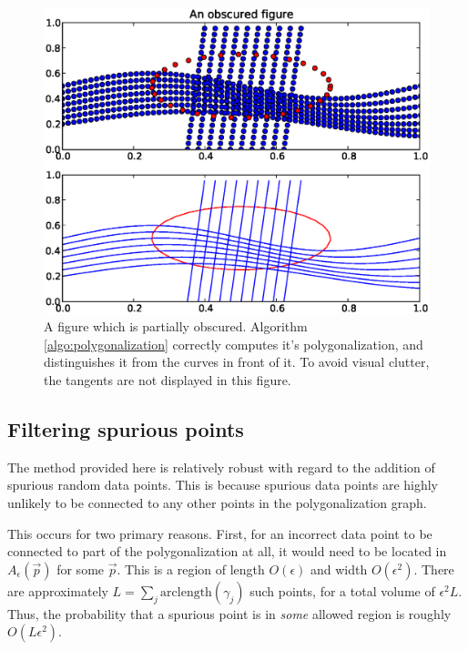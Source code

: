 \documentclass{article}
\numberwithin{cntr}{section}
\numberwithin{equation}{section}
\newcommand{\vp}[0]{{\vec{p}}}
\newcommand{\allowed}[2]{ { A_{#1}(#2) } }
\begin{document}
\begin{figure}
\setlength{\unitlength}{0.240900pt}
\ifx\plotpoint\undefined\newsavebox{\plotpoint}\fi
\sbox{\plotpoint}{\rule[-0.200pt]{0.400pt}{0.400pt}}%
\includegraphics[scale=0.5]{obscured_figure.eps}

\caption{A figure which is partially obscured. Algorithm \ref{algo:polygonalization} correctly computes it's polygonalization, and distinguishes it from the curves in front of it. To avoid visual clutter, the tangents are not displayed in this figure.}
\label{fig:obscuredExample}
\end{figure}

\subsection{Filtering spurious points}

The method provided here is relatively robust with regard to the addition of spurious random data points. This is because spurious data points are highly unlikely to be connected to any other points in the polygonalization graph.

This occurs for two primary reasons. First, for an incorrect data point to be connected to part of the polygonalization at all, it would need to be located in $\allowed{\epsilon}{\vp}$ for some $\vp$. This is a region of length $O(\epsilon)$ and width $O(\epsilon^{2})$. There are approximately $L = \sum_{j} \textrm{arclength}(\gamma_{j})$ such points, for a total volume of $\epsilon^{2} L$. Thus, the probability that a spurious point is in \emph{some} allowed region is roughly $O(L \epsilon^{2})$.
\end{document}
